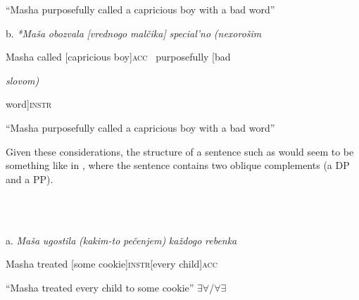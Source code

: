\documentclass[output=paper,modfonts, nonflat]{langsci/langscibook}
\begin{document}
\begin{styleinnerExample}
\begin{styleinnerExample}
    “Masha purposefully called a capricious boy with a bad word”
\end{styleinnerExample}

\begin{styleinnerExample}
  b.  \textit{*Maša}  \textit{obozvala} \textit{[vrednogo} \textit{malčika]}  \textit{special’no}      \textit{(nexorošim} 
\end{styleinnerExample}

\begin{styleinnerExample}
      Masha called     [capricious boy]\textsc{acc~} purposefully  [bad
\end{styleinnerExample}

\begin{styleinnerExample}
    \textit{slovom)}
\end{styleinnerExample}

\begin{styleinnerExample}
    word]\textsc{instr}
\end{styleinnerExample}

\begin{styleinnerExample}
    “Masha purposefully called a capricious boy with a bad word”
\end{styleinnerExample}

Given these considerations, the structure of a sentence such as  would seem to be something like in , where the sentence contains two oblique complements (a DP and a PP).

\begin{styleinnerExample}
\ea%
    \label{ex:key:52}
    \gll\\
        \\
    \glt
    \z

           a.  \textit{Maša}   \textit{ugostila} \textit{(kakim-to} \textit{pečenjem)}      \textit{každogo} \textit{rebenka}
\end{styleinnerExample}

\begin{styleinnerExample}
    Masha treated   [some       cookie]\textsc{instr}[every     child]\textsc{acc}
\end{styleinnerExample}

\begin{styleinnerExample}
    “Masha treated every child to some cookie” ${\exists}{\forall}$/${\forall}{\exists}$
\end{styleinnerExample}


\end{styleinnerExample}
\end{document}
